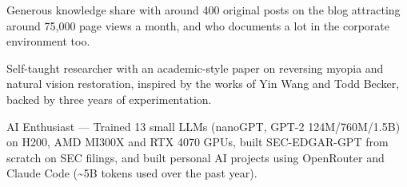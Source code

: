 \begin{cventry}
{\begin{cvitems}
            \item {Generous knowledge share with around 400 original posts on the blog attracting around 75,000 page views a month, and who documents a lot in the corporate environment too.}
            \item {Self-taught researcher with an academic-style paper on reversing myopia and natural vision restoration, inspired by the works of Yin Wang and Todd Becker, backed by three years of experimentation.}
            \item {AI Enthusiast --- Trained 13 small LLMs (nanoGPT, GPT-2 124M/760M/1.5B) on H200, AMD MI300X and RTX 4070 GPUs, built SEC-EDGAR-GPT from scratch on SEC filings, and built personal AI projects using OpenRouter and Claude Code (\textasciitilde5B tokens used over the past year).}
        \end{cvitems}
    }
\end{cventry}
